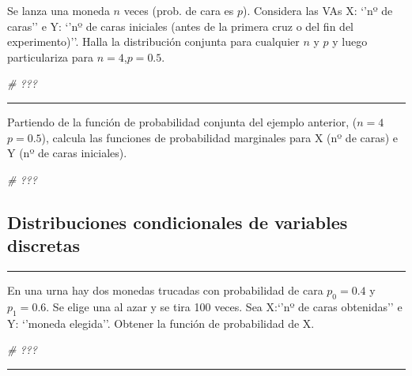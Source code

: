 \documentclass[
]{article}
\newenvironment{Shaded}{\begin{snugshade}}{\end{snugshade}}
\newcommand{\CommentTok}[1]{\textcolor[rgb]{0.56,0.35,0.01}{\textit{#1}}}
\begin{document}
Se lanza una moneda \(n\) veces (prob. de cara es \(p\)). Considera las
VAs X: `'nº de caras'' e Y: `'nº de caras iniciales (antes de la primera
cruz o del fin del experimento)''. Halla la distribución conjunta para
cualquier \(n\) y \(p\) y luego particulariza para \(n=4\),\(p=0.5\).

\begin{Shaded}
\begin{Highlighting}[]
\CommentTok{\# ???}
\end{Highlighting}
\end{Shaded}

\begin{center}\rule{0.5\linewidth}{0.5pt}\end{center}

Partiendo de la función de probabilidad conjunta del ejemplo anterior,
(\(n=4\) \(p=0.5\)), calcula las funciones de probabilidad marginales
para X (nº de caras) e Y (nº de caras iniciales).

\begin{Shaded}
\begin{Highlighting}[]
\CommentTok{\# ???}
\end{Highlighting}
\end{Shaded}

\hypertarget{distribuciones-condicionales-de-variables-discretas}{%
\subsection{Distribuciones condicionales de variables
discretas}\label{distribuciones-condicionales-de-variables-discretas}}

\begin{center}\rule{0.5\linewidth}{0.5pt}\end{center}

En una urna hay dos monedas trucadas con probabilidad de cara
\(p_0=0.4\) y \(p_1=0.6\). Se elige una al azar y se tira 100 veces. Sea
X:`'nº de caras obtenidas'' e Y: `'moneda elegida''. Obtener la función
de probabilidad de X.

\begin{Shaded}
\begin{Highlighting}[]
\CommentTok{\# ???}
\end{Highlighting}
\end{Shaded}

\begin{center}\rule{0.5\linewidth}{0.5pt}\end{center}
\end{document}
